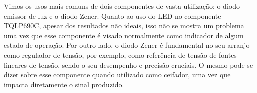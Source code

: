 \documentclass[a4paper]{report}
\begin{document}
Vimos os usos mais comuns de dois componentes de vasta utilização: o diodo emissor de luz e o diodo Zener. Quanto ao uso do LED no componente TQLP690C, apesar dos resultados não ideais, isso não se mostra um problema uma vez que esse componente é visado normalmente como indicador de algum estado de operação. Por outro lado, o diodo Zener é fundamental no seu arranjo como regulador de tensão, por exemplo, como referência de tensão de fontes lineares de tensão, sendo o seu desempenho e precisão cruciais. O mesmo pode-se dizer sobre esse componente quando utilizado como ceifador, uma vez que impacta diretamente o sinal produzido.
\end{document}
